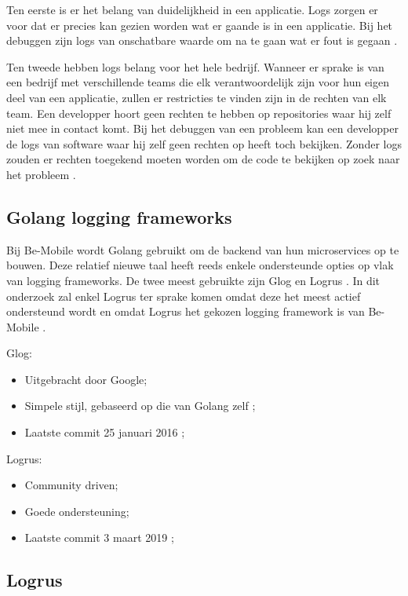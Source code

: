 Ten eerste is er het belang van duidelijkheid in een applicatie. Logs zorgen er voor dat er precies kan gezien worden wat er gaande is in een applicatie. Bij het debuggen zijn logs van onschatbare waarde om na te gaan wat er fout is gegaan \autocite{logdna2018}.

Ten tweede hebben logs belang voor het hele bedrijf. Wanneer er sprake is van een bedrijf met verschillende teams die elk verantwoordelijk zijn voor hun eigen deel van een applicatie, zullen er restricties te vinden zijn in de rechten van elk team. Een developper hoort geen rechten te hebben op repositories waar hij zelf niet mee in contact komt. Bij het debuggen van een probleem kan een developper de logs van software waar hij zelf geen rechten op heeft toch bekijken. Zonder logs zouden er rechten toegekend moeten worden om de code te bekijken op zoek naar het probleem \autocite{czanik2013}.

\subsection{Golang logging frameworks}

Bij Be-Mobile wordt Golang gebruikt om de backend van hun microservices op te bouwen. Deze relatief nieuwe taal heeft reeds enkele ondersteunde opties op vlak van logging frameworks. De twee meest gebruikte zijn Glog en Logrus \autocite{Dietrich2018}. In dit onderzoek zal enkel Logrus ter sprake komen omdat deze het meest actief ondersteund wordt en omdat Logrus het gekozen logging framework is van Be-Mobile \autocite{jens2019}.

Glog:
\begin{itemize}
    \item Uitgebracht door Google;
    \item Simpele stijl, gebaseerd op die van Golang zelf \autocite{Dietrich2018};
    \item Laatste commit 25 januari 2016 \autocite{Glog2013};
\end{itemize}

Logrus:
\begin{itemize}
    \item Community driven;
    \item Goede ondersteuning;
    \item Laatste commit 3 maart 2019 \autocite{sirupsen2014};
\end{itemize}

\subsection{Logrus}

